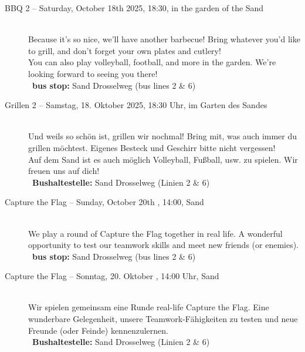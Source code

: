 \begin{description}

\ifml
    \item[BBQ 2 -- Saturday, October 18th 2025, 18:30, in the garden of the Sand]~\\
    Because it's so nice, we'll have another barbecue!
    Bring whatever you'd like to grill, and don’t forget your own plates and cutlery!\\
    You can also play volleyball, football, and more in the garden. We’re looking forward to seeing you there!\\
    ~\textbf{bus stop:} Sand Drosselweg (bus lines 2 \& 6)
\else
    \item[Grillen 2 -- Samstag, 18. Oktober 2025, 18:30 Uhr, im Garten des Sandes]~\\
    Und weils so schön ist, grillen wir nochmal!
    Bring mit, was auch immer du grillen möchtest. Eigenes Besteck und Geschirr bitte nicht vergessen!\\
    Auf dem Sand ist es auch möglich Volleyball, Fußball, usw. zu spielen. Wir freuen uns auf dich!\\
    ~\textbf{Bushaltestelle:} Sand Drosselweg (Linien 2 \& 6)
\fi

\ifml
    \item[Capture the Flag -- Sunday, October 20th \YEAR, 14:00, Sand]~\\
    We play a round of Capture the Flag together in real life.
    A wonderful opportunity to test our teamwork skills and meet new friends (or enemies).\\
    ~\textbf{bus stop:} Sand Drosselweg (bus lines 2 \& 6)
\else
    \item[Capture the Flag -- Sonntag, 20. Oktober \YEAR, 14:00 Uhr, Sand]~\\
    Wir spielen gemeinsam eine Runde real-life Capture the Flag.
    Eine wunderbare Gelegenheit, unsere Teamwork-Fähigkeiten zu testen und neue Freunde (oder Feinde) kennenzulernen.\\
    ~\textbf{Bushaltestelle:} Sand Drosselweg (Linien 2 \& 6)
\fi


\end{description}
